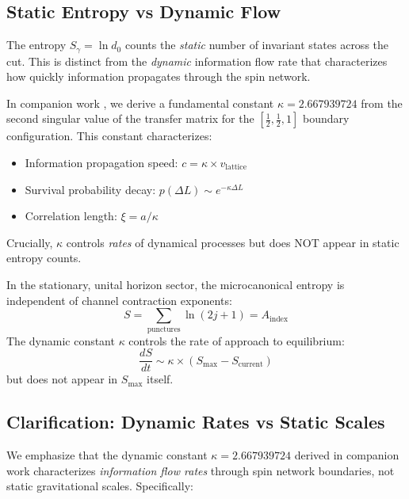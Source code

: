 \documentclass[11pt]{article}
\begin{document}
\subsection{Static Entropy vs Dynamic Flow}

The entropy $S_\gamma = \ln d_0$ counts the \emph{static} number of invariant states across the cut. This is distinct from the \emph{dynamic} information flow rate that characterizes how quickly information propagates through the spin network.

\begin{remark}
  In companion work \cite{SandozOperatorAlgebraic2025}, we derive a fundamental constant $\kappa = 2.667939724$ from the second singular value of the transfer matrix for the $[\frac{1}{2}, \frac{1}{2}, 1]$ boundary configuration. This constant characterizes:
  \begin{itemize}
    \item Information propagation speed: $c = \kappa \times v_{\text{lattice}}$
    \item Survival probability decay: $p(\Delta L) \sim e^{-\kappa \Delta L}$
    \item Correlation length: $\xi = a/\kappa$
  \end{itemize}
  Crucially, $\kappa$ controls \emph{rates} of dynamical processes but does NOT appear in static entropy counts.
\end{remark}

\begin{lemma}
  In the stationary, unital horizon sector, the microcanonical entropy is independent of channel contraction exponents:
  \[
    S = \sum_{\text{punctures}} \ln(2j + 1) = A_{\text{index}}
  \]
  The dynamic constant $\kappa$ controls the rate of approach to equilibrium:
  \[
    \frac{dS}{dt} \sim \kappa \times (S_{\text{max}} - S_{\text{current}})
  \]
  but does not appear in $S_{\text{max}}$ itself.
\end{lemma}

\subsection{Clarification: Dynamic Rates vs Static Scales}

We emphasize that the dynamic constant $\kappa = 2.667939724$ derived in companion work \cite{SandozOperatorAlgebraic2025} characterizes \emph{information flow rates} through spin network boundaries, not static gravitational scales. Specifically:
\end{document}
